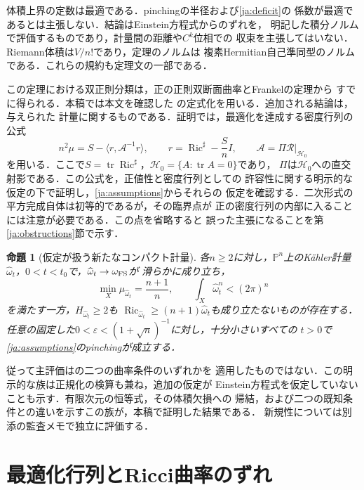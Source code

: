\documentclass[12pt]{amsart}
\theoremstyle{definition}
\theoremstyle{remark}
\numberwithin{equation}{section}
\DeclareMathOperator{\Ric}{Ric}
\DeclareMathOperator{\tr}{tr}
\theoremstyle{plain}
\newtheorem{jprop}[thm]{命題}
\theoremstyle{remark}
\theoremstyle{definition}
\begin{document}
体積上界の定数は最適である．pinchingの半径および\eqref{ja:deficit}の
係数が最適であるとは主張しない．結論はEinstein方程式からのずれを，
明記した積分ノルムで評価するものであり，計量間の距離や$C^k$位相での
収束を主張してはいない．Riemann体積は$V/n!$であり，定理のノルムは
複素Hermitian自己準同型のノルムである．これらの規約も定理文の一部である．

この定理における双正則分類は，正の正則双断面曲率とFrankelの定理から
すでに得られる\cite{ja:SY}．本稿では本文を確認した
\cite[Theorem 0.1]{ja:FLW}の定式化を用いる．追加される結論は，与えられた
計量に関するものである．証明では，最適化を達成する密度行列の公式
\begin{equation}\label{ja:identityintro}
 n^2\mu=S-\langle r,\mathcal A^{-1}r\rangle,
 \qquad r=\Ric^\sharp-\frac Sn I,
 \qquad \mathcal A=\Pi\mathscr R|_{\mathcal H_0}
\end{equation}
を用いる．ここで$S=\tr\Ric^\sharp$，$\mathcal H_0=\{A:\tr A=0\}$であり，
$\Pi$は$\mathcal H_0$への直交射影である．この公式を，正値性と密度行列としての
許容性に関する明示的な仮定の下で証明し，\eqref{ja:assumptions}からそれらの
仮定を確認する．二次形式の平方完成自体は初等的であるが，その臨界点が
正の密度行列の内部に入ることには注意が必要である．この点を省略すると
誤った主張になることを第\ref{ja:obstructions}節で示す．

\begin{jprop}[仮定が扱う新たなコンパクト計量]\label{ja:family}
各$n\geq2$に対し，$\mathbb P^n$上のK\"ahler計量
$\widehat\omega_t$，$0<t<t_0$で，$\widehat\omega_t\to\omega_{\rm FS}$が
滑らかに成り立ち，
\[
 \min_X\mu_{\widehat\omega_t}=\frac{n+1}{n},\qquad
 \int_X\widehat\omega_t^n<(2\pi)^n
\]
を満たす一方，$H_{\widehat\omega_t}\geq2$も
$\Ric_{\widehat\omega_t}\geq(n+1)\widehat\omega_t$も成り立たないものが存在する．
任意の固定した$0<\varepsilon<(1+\sqrt n)^{-1}$に対し，十分小さいすべての
$t>0$で\eqref{ja:assumptions}のpinchingが成立する．
\end{jprop}

従って主評価は\cite[Corollary 1.2]{ja:DS}の二つの曲率条件のいずれかを
適用したものではない．この明示的な族は正規化の検算も兼ね，追加の仮定が
Einstein方程式を仮定していないことも示す．有限次元の恒等式，その体積欠損への
帰結，および二つの既知条件との違いを示すこの族が，本稿で証明した結果である．
新規性については別添の監査メモで独立に評価する．

\section{最適化行列とRicci曲率のずれ}\label{ja:algebra}
\end{document}
